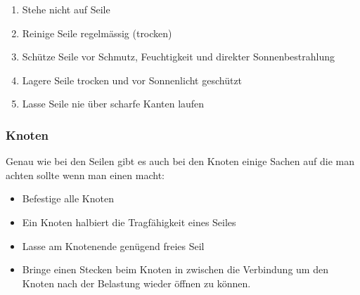 \begin{enumerate}
    \item Stehe nicht auf Seile
    \item Reinige Seile regelmässig (trocken)
    \item Schütze Seile vor Schmutz, Feuchtigkeit und direkter Sonnenbestrahlung
    \item Lagere Seile trocken und vor Sonnenlicht geschützt
    \item Lasse Seile nie über scharfe Kanten laufen
\end{enumerate}

\subsubsection{Knoten}

Genau wie bei den Seilen gibt es auch bei den Knoten einige Sachen auf die man achten sollte wenn man einen macht:
\begin{itemize}
    \item Befestige alle Knoten
    \item Ein Knoten halbiert die Tragfähigkeit eines Seiles
    \item Lasse am Knotenende genügend freies Seil
    \item Bringe einen Stecken beim Knoten in zwischen die Verbindung um den Knoten nach der Belastung wieder öffnen zu können.
\end{itemize}

